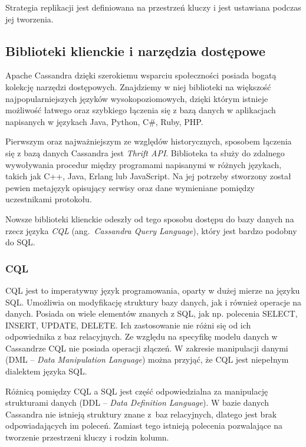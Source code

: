Strategia replikacji jest definiowana na przestrzeń kluczy i jest ustawiana podczas jej tworzenia.

\subsection{Biblioteki klienckie i narzędzia dostępowe}

Apache Cassandra dzięki szerokiemu wsparciu społeczności posiada bogatą kolekcję narzędzi dostępowych. 
Znajdziemy w niej biblioteki na większość najpopularniejszych języków wysokopoziomowych, dzięki którym istnieje możliwość łatwego oraz szybkiego łączenia się z bazą danych w aplikacjach napisanych w językach Java, Python, C\#, Ruby, PHP.

Pierwszym oraz najważniejszym ze względów historycznych, sposobem łączenia się z bazą danych Cassandra jest \textit{Thrift API}.
Biblioteka ta służy do zdalnego wywoływania procedur między programami napisanymi w różnych językach, takich jak C++, Java, Erlang lub JavaScript.
Na jej potrzeby stworzony został pewien metajęzyk opisujący serwisy oraz dane wymieniane pomiędzy uczestnikami protokołu.

Nowsze biblioteki klienckie odeszły od tego sposobu dostępu do bazy danych na rzecz języka \textit{CQL} (ang.~\textit{Cassandra Query Language}), który jest bardzo podobny do SQL.

\subsubsection{CQL}

CQL jest to imperatywny język programowania, oparty w dużej mierze na języku SQL.
Umożliwia on modyfikację struktury bazy danych, jak i również operacje na danych.
Posiada on wiele elementów znanych z SQL, jak np. polecenia SELECT, INSERT, UPDATE, DELETE.
Ich zastosowanie nie różni się od ich odpowiednika z baz relacyjnych. 
Ze względu na specyfikę modelu danych w Cassandrze CQL nie posiada operacji złączeń.
W zakresie manipulacji danymi (DML -- \textit{Data Manipulation Language}) można przyjąć, że CQL jest niepełnym dialektem języka SQL.

Różnicą pomiędzy CQL a SQL jest część odpowiedzialna za manipulację strukturami danych (DDL -- \textit{Data Definition Language}).
W bazie danych Cassandra nie istnieją struktury znane z~baz relacyjnych, dlatego jest brak odpowiadających im poleceń.
Zamiast tego istnieją polecenia pozwalające na tworzenie przestrzeni kluczy i rodzin kolumn.

